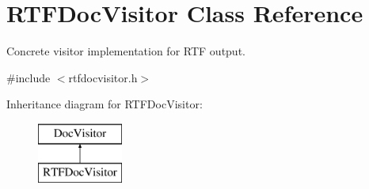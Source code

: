 \hypertarget{class_r_t_f_doc_visitor}{}\section{R\+T\+F\+Doc\+Visitor Class Reference}
\label{class_r_t_f_doc_visitor}


Concrete visitor implementation for R\+TF output.  




{\ttfamily \#include $<$rtfdocvisitor.\+h$>$}

Inheritance diagram for R\+T\+F\+Doc\+Visitor\+:\begin{figure}[H]
\begin{center}
\leavevmode
\includegraphics[height=2.000000cm]{class_r_t_f_doc_visitor}
\end{center}
\end{figure}
